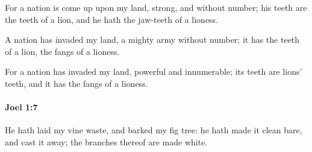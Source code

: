 			\begin{versebox}
					\item[BHS] 
					\item[LXX] 
					\item[ASV] For a nation is come up upon my land, strong, and without number; his teeth are the teeth of a lion, and he hath the jaw-teeth of a lioness.
					\item[NIV] A nation has invaded my land, a mighty army without number; it has the teeth of a lion, the fangs of a lioness.
					\item[NRSV] For a nation has invaded my land, powerful and innumerable; its teeth are lions’ teeth, and it has the fangs of a lioness.
			\end{versebox}

		\paragraph{Joel 1:7} %
			\label{JOEL-1-7}

			He hath laid my vine waste, and barked my fig tree: he hath made it clean bare, and cast it away; the branches thereof are made white.

